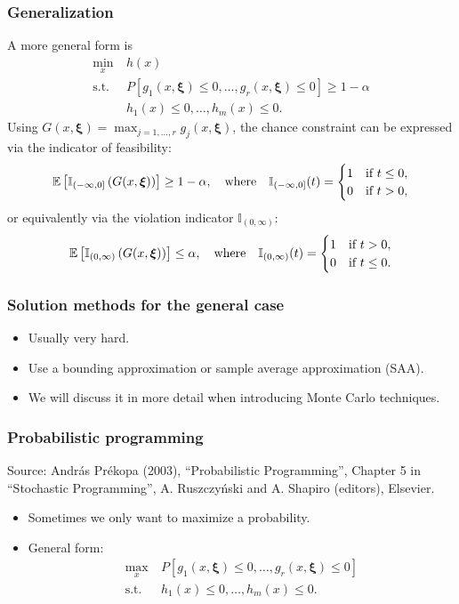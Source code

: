 \documentclass[aspectratio=169]{beamer}
\def\bxi{\boldsymbol\xi}
\begin{document}
\begin{frame}
\frametitle{Generalization}

A more general form is
\begin{align*}
	\min_x \ & h(x) \\
	\text{s.t. } & P[ g_1(x, \bxi) \leq 0,\ldots, g_r(x, \bxi) \leq 0] \geq 1-\alpha \\
	& h_1(x) \leq 0,\ldots, h_m(x) \leq 0.
\end{align*}
Using $G(x, \bxi) = \max_{j=1,\dots,r} g_j(x, \bxi)$, the chance constraint can be expressed via the indicator of feasibility:
\[
\EE\left[ \mathbb{I}_{(-\infty, 0]} \left( G(x, \bxi) \right) \right] \geq 1-\alpha, \quad \text{where} \quad
\mathbb{I}_{(-\infty,0]}(t) =
\begin{cases}
	1 & \text{if } t \leq 0,\\
	0 & \text{if } t > 0,
\end{cases}
\]
or equivalently via the violation indicator $\mathbb{I}_{(0,\infty)}$:
\[
\EE\left[ \mathbb{I}_{(0,\infty)} \left( G(x, \bxi) \right) \right] \leq \alpha, \quad \text{where} \quad
\mathbb{I}_{(0,\infty)}(t) =
\begin{cases}
	1 & \text{if } t > 0,\\
	0 & \text{if } t \leq 0.
\end{cases}
\]

\end{frame}

\begin{frame}
\frametitle{Solution methods for the general case}

\begin{itemize}
\item	
Usually very hard.
\item
Use a bounding approximation or sample average approximation (SAA).
\item
We will discuss it in more detail when introducing Monte Carlo techniques.
\end{itemize}

\end{frame}

\begin{frame}
\frametitle{Probabilistic programming}

Source: András Prékopa (2003), ``Probabilistic Programming'', Chapter 5 in ``Stochastic Programming'', A. Ruszczy\'nski and A. Shapiro (editors), Elsevier.

\mbox{}

\begin{itemize}
	\item 
Sometimes we only want to maximize a probability.
\item
General form:
\begin{align*}
\max_x \ & P[ g_1(x, \bxi) \leq 0,\ldots, g_r(x, \bxi) \leq 0] \\
\text{s.t. } & h_1(x) \leq 0,\ldots, h_m(x) \leq 0.
\end{align*}
\end{itemize}

\end{frame}
\end{document}

